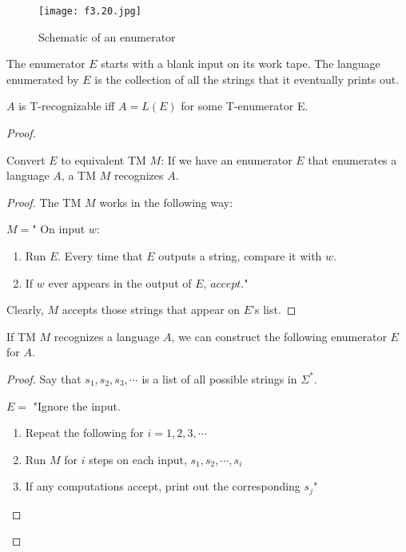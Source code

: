 \begin{figure}[H]
    \centering
    \texttt{[image: f3.20.jpg]}
    \caption{Schematic of an enumerator}
\end{figure}

The enumerator \(E\) starts with a blank input on its work tape. The language enumerated by \(E\) is the collection of all the strings that it eventually prints out.  

\begin{theorem}
    \(A\) is T-recognizable iff \(A = L(E)\) for some T-enumerator E. 
\end{theorem}
\begin{proof}
    \begin{lemma}
        Convert \(E\) to equivalent TM \(M\): If we have an enumerator \(E\) that enumerates a language \(A\), a TM \(M\) recognizes \(A\).     
    \end{lemma}
    \begin{proof}
       The TM \(M\) works in the following way:
         
       \(M = \)" On input \(w\):
       \begin{enumerate}
        \item Run \(E\). Every time that \(E\) outputs a string, compare it with \(w\).
        \item If \(w\) ever appears in the output of \(E\), \(accept\)."    
       \end{enumerate}

       Clearly, \(M\) accepts those strings that appear on \(E\)'s list.  
    \end{proof}

    \begin{lemma}
        If TM \(M\) recognizes a language \(A\), we can construct the following enumerator \(E\) for \(A\).    
    \end{lemma}
    \begin{proof}
        Say that \(s_1, s_2, s_3, \cdots\) is a list of all possible strings in \(\Sigma^*\). 

        \(E = \) "Ignore the input.
        \begin{enumerate}
            \item Repeat the following for \(i = 1, 2, 3, \cdots\) 
            \item Run \(M\) for \(i\) steps on each input, \(s_1, s_2, \cdots, s_i\)
            \item If any computations accept, print out the corresponding \(s_j\)" 
        \end{enumerate} 


\end{proof}
\end{proof}
